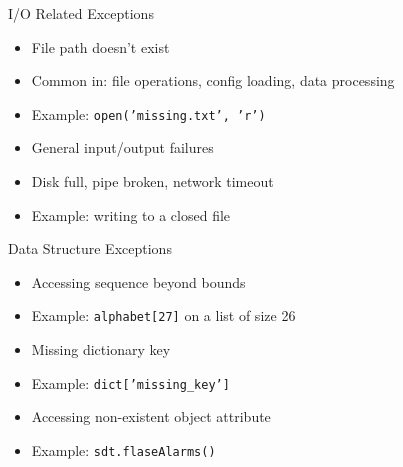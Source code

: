 \documentclass[aspectratio=169]{beamer}
\begin{document}
\begin{frame}{I/O Related Exceptions}
    \begin{itemize}[<2->]
        \item File path doesn't exist
        \item Common in: file operations, config loading, data processing
        \item Example: \texttt{open('missing.txt', 'r')}
    \end{itemize}

    \begin{itemize}[<6->]
        \item General input/output failures
        \item Disk full, pipe broken, network timeout
        \item Example: writing to a closed file
    \end{itemize}

\end{frame}

\begin{frame}{Data Structure Exceptions}
    \begin{itemize}[<2->]
        \item Accessing sequence beyond bounds
        \item Example: \texttt{alphabet[27]} on a list of size 26
    \end{itemize}

    \begin{itemize}[<5->]
        \item Missing dictionary key
        \item Example: \texttt{dict['missing\_key']}
    \end{itemize}

    \begin{itemize}[<8->]
        \item Accessing non-existent object attribute
        \item Example: \texttt{sdt.flaseAlarms()}
    \end{itemize}
\end{frame}
\end{document}
